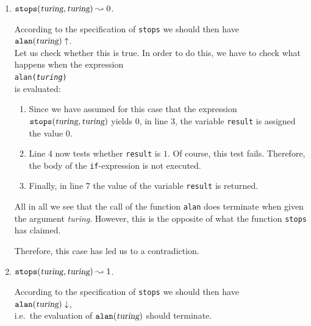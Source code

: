 \begin{enumerate}
\item $\mathtt{stops}(\textsl{turing}, \textsl{turing}) \leadsto 0$. 

      According to the specification of \texttt{stops} we should then have
      \\[0.2cm]
      \hspace*{1.3cm}
      $\mathtt{alan}(\textsl{turing}) \uparrow$.
      \\[0.2cm]
      Let us check whether this is true.  In order to do this, we have to check what happens when
      the expression
      \\[0.2cm]
      \hspace*{1.3cm}
      \texttt{alan(\textsl{turing})} 
      \\[0.2cm]
      is evaluated:
      \begin{enumerate}
      \item Since we have assumed for this case that the expression 
            $\mathtt{stops}(\textsl{turing}, \textsl{turing})$ yields $0$, 
            in line 3, the variable \texttt{result} is assigned the value 0. 
      \item Line 4 now tests whether \texttt{result} is $1$.  Of course,
            this test fails.  Therefore, the body of the \texttt{if}-expression is not executed.
      \item Finally, in line 7 the value of the variable \texttt{result} is returned. 
      \end{enumerate}
      All in all we see that the call of the function \texttt{alan} does terminate when given the argument
      \textsl{turing}.  However, this is the opposite of what the function \texttt{stops} has claimed.
      
      Therefore, this case has led us to a contradiction.
\item  $\mathtt{stops}(\textsl{turing}, \textsl{turing}) \leadsto 1$. 

      According to the specification of \texttt{stops} we should then have
      \\[0.2cm]
      \hspace*{1.3cm}
      $\mathtt{alan}(\textsl{turing}) \downarrow$, 
      \\[0.2cm]
      i.e.~the evaluation of $\mathtt{alan}(\textsl{turing})$ should terminate.
      

\end{enumerate}
